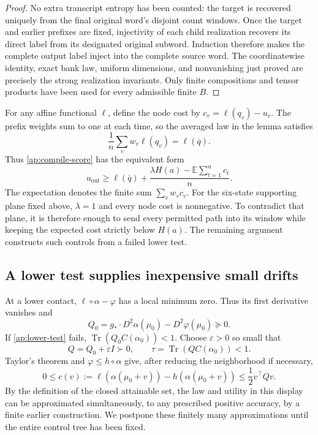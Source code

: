 \documentclass[11pt]{article}
\numberwithin{equation}{section}
\theoremstyle{definition}
\theoremstyle{remark}
\DeclareMathOperator{\Tr}{Tr}
\begin{document}
\begin{proof}
No extra transcript entropy has been counted: the target is recovered
uniquely from the final original word's disjoint count windows.  Once
the target and earlier prefixes are fixed, injectivity of each child
realization recovers its direct label from its designated original subword.
Induction therefore makes the complete output label inject into the
complete source word.  The coordinatewise identity, exact bank law,
uniform dimensions, and nonvanishing just proved are precisely the strong
realization invariants.  Only finite compositions and tensor products have
been used for every admissible finite \(B\).
\end{proof}

For any affine functional \(\ell\), define the node cost by
\(c_v=\ell(q_v)-u_v\).  The prefix weights sum to one at each time,
so the averaged law in the lemma satisfies
\[
 \frac1n\sum_v w_v\ell(q_v)=\ell(\overline q).
\]
Thus \eqref{ap:compile-score} has the equivalent form
\begin{equation}\label{ap:compile-gain}
 u_{\mathrm{out}}
 \geq\ell(\overline q)
       +\frac{\lambda H(a)-\mathbb E\sum_{t=1}^n c_t}{n}.
\end{equation}
The expectation denotes the finite sum \(\sum_v w_vc_v\).
For the six-state supporting plane fixed above, \(\lambda=1\) and
every node cost is nonnegative.  To contradict that plane, it is therefore
enough to send every permitted path into its window while keeping the
expected cost strictly below \(H(a)\).  The remaining argument constructs
such controls from a failed lower test.

\subsection{A lower test supplies inexpensive small drifts}
\label{ap:local-cost}

At a lower contact, \(\ell\circ\alpha-\varphi\) has a local minimum
zero.  Thus its first derivative vanishes and
\begin{equation}\label{ap:q0}
 Q_0=g_*\cdot D^2\alpha(\mu_0)-D^2\varphi(\mu_0)\succeq0.
\end{equation}
If \eqref{ap:lower-test} fails, \(\Tr(Q_0C(\alpha_0))<1\).
Choose \(\varepsilon>0\) so small that
\begin{equation}\label{ap:tau}
 Q=Q_0+\varepsilon I\succ0,
 \qquad \tau=\Tr(QC(\alpha_0))<1.
\end{equation}
Taylor's theorem and \(\varphi\leq h\circ\alpha\) give, after reducing
the neighborhood if necessary,
\begin{equation}\label{ap:local-cost-bound}
 0\leq c(v):=\ell(\alpha(\mu_0+v))-h(\alpha(\mu_0+v))
 \leq \frac12v^\top Qv.
\end{equation}
By the definition of the closed attainable set, the law and utility in
this display can be approximated simultaneously, to any prescribed positive
accuracy, by a finite earlier construction.  We postpone these finitely
many approximations until the entire control tree has been fixed.
\end{document}
